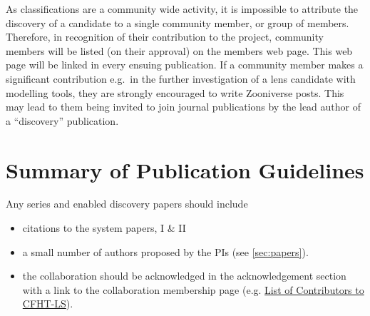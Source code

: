 \documentclass[a4paper,twocolumn]{article}
\begin{document}
As \SW classifications are a community wide activity, it is impossible to attribute the discovery of a candidate to a single community member, or group  of members. Therefore, in recognition of their contribution to the \SW project, \SW community members will be listed (on their approval) on the \SW members web page. This web page will be linked in every ensuing \SW publication. If a community member makes a significant contribution e.g.\ in the further investigation of a lens candidate with modelling tools, they are strongly encouraged to write Zooniverse posts. This may lead to them being invited to join journal publications by the lead author of a ``discovery'' publication. 




\section{Summary of Publication Guidelines}
\label{sec:publ}
Any \SW series and \SW enabled discovery papers should include
\begin{itemize}
\item citations to the \SW system papers, \SW I \& II
\item a small number of \SW authors proposed by the \SW PIs (see \ref{sec:papers}).
\item the collaboration should be acknowledged in the acknowledgement section with a link to the collaboration membership page (e.g. \href{https://spacewarps.org/#/projects/CFHTLS/contributors}{List of Contributors to CFHT-LS}).
\end{itemize}


\end{document}
